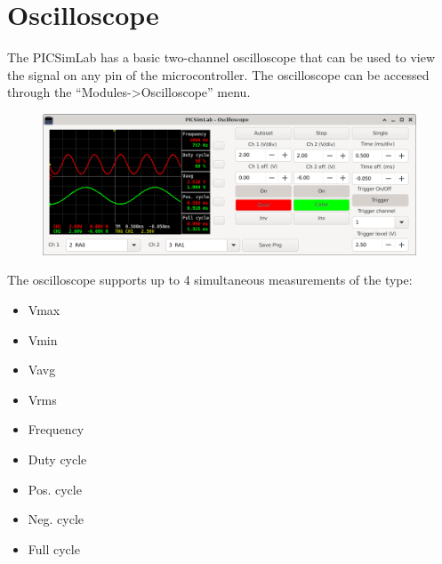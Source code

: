 \chapter{Oscilloscope}
 
 The PICSimLab has a basic two-channel oscilloscope that can be used to view the signal on any pin 
 of the microcontroller. The oscilloscope can be accessed through the ``Modules->Oscilloscope'' menu.
\begin{figure}[H]
\center
\includegraphics[width=0.99\textwidth]{img/osc.png} 
\end{figure} 

The oscilloscope supports up to 4 simultaneous measurements of the type: 
\begin{itemize}
 \item Vmax
 \item Vmin
 \item Vavg
 \item Vrms
 \item Frequency
 \item Duty cycle
 \item Pos. cycle
 \item Neg. cycle
 \item Full cycle
\end{itemize}


